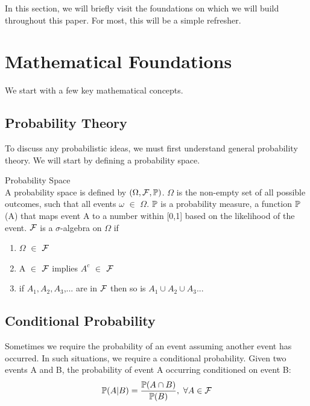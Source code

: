 In this section, we will briefly visit the foundations on which we will build throughout this paper. For most, this will be a simple refresher.

\section{Mathematical Foundations}
We start with a few key mathematical concepts.
\subsection{Probability Theory}
To discuss any probabilistic ideas, we must first understand general probability theory. We will start by defining a probability space.
\begin{definition}
    \label{probtheory}
    Probability Space \\
    A probability space is defined by $(\Omega ,\mathcal{F} , \mathbb{P})$. $\Omega$ is the non-empty set of all possible outcomes, such that all events $\omega$ $\in$ $\Omega$. $\mathbb{P}$ is a probability measure, a function $\mathbb{P}$(A) that maps event A to a number within [0,1] based on the likelihood of the event. $\mathcal{F}$ is a $\sigma$-algebra on $\Omega$ if

    \begin{enumerate}
        \item $\Omega$ $\in$ $\mathcal{F}$
        \item A $\in$ $\mathcal{F}$ implies $A^c$ $\in$ $\mathcal{F}$
        \item if $A_1, A_2, A_3$,... are in $\mathcal{F}$ then so is $A_1 \cup A_2 \cup A_3$...
    \end{enumerate}
\end{definition}

\subsection{Conditional Probability}
Sometimes we require the probability of an event assuming another event has occurred. In such situations, we require a conditional probability. Given two events A and B, the probability of event A occurring conditioned on event B: \\ 
\begin{equation}
\label{condprob}
    \mathbb{P} (A|B) = \dfrac{\mathbb{P} (A \cap B)}{\mathbb{P} (B)}, \  \forall A \in \mathcal{F}
\end{equation}
\\

